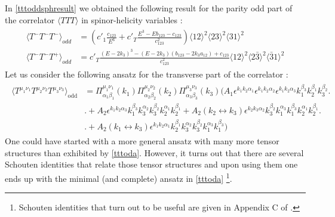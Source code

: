 \documentclass[a4paper,11pt]{article}
\begin{document}
In \eqref{tttoddsphresult} we obtained the following result for the parity odd part of the correlator $\langle TTT \rangle$ in spinor-helicity variables :  
%
\begin{align}\label{tttsph1}
\begin{split}
\langle T^-T^-T^- \rangle_{odd} &= \left(c'_1\frac{c_{123}}{E^6}+c'_T\frac{E^3-Eb_{123}-c_{123}}{c_{123}^2}\right)\langle 12 \rangle^2 \langle 23 \rangle^2 \langle 31 \rangle^2\\[5 pt]
\langle T^-T^-T^+ \rangle_{odd} &= c'_T\frac{(E-2k_3)^3-(E-2k_3)(b_{123}-2k_3 a_{12})+c_{123}}{c_{123}^2}\langle 12 \rangle^2 \langle 2\bar{3} \rangle^2 \langle \bar{3}1 \rangle^2
\end{split}
\end{align}
Let us consider the following ansatz for the transverse part of the correlator : 
\begin{align}\label{tttoda}
\begin{split}
\langle T^{\mu_1\nu_1}T^{\mu_2 \nu_2}T^{\mu_3\nu_3} \rangle_{\text{odd}}&=\Pi^{\mu_1\nu_1}_{\alpha_1\beta_1}(k_1)\Pi^{\mu_2\nu_2}_{\alpha_2\beta_2}(k_2)\Pi^{\mu_3\nu_3}_{\alpha_3\beta_3}(k_3)\bigg(A_1 \epsilon^{k_1 k_2 \alpha_1}\epsilon^{k_1 k_2 \alpha_2}\epsilon^{k_1 k_2 \alpha_3}k_1^{\beta_3}k_2^{\beta_1}k_3^{\beta_2}\bigg.\\[5 pt]
&\bigg.+A_2 \epsilon^{k_1 k_2 \alpha_3}k_1^{\beta_3}k_3^{\alpha_2}k_3^{\beta_2}k_2^{\alpha_1}k_2^{\beta_1}+A_2 (k_2 \leftrightarrow k_3) \epsilon^{k_2 k_3 \alpha_2}k_3^{\beta_2}k_1^{\alpha_3}k_1^{\beta_3}k_2^{\alpha_1}k_2^{\beta_1}\bigg.\\[5 pt]
&\bigg.+A_2 (k_1 \leftrightarrow k_3) \epsilon^{k_1 k_2 \alpha_1}k_2^{\beta_1}k_3^{\alpha_2}k_3^{\beta_2}k_1^{\alpha_3}k_1^{\beta_3}\bigg)
\end{split}
\end{align}
One could have started with a more general ansatz with many more tensor structures than exhibited by \eqref{tttoda}. However, it turns out that there are several Schouten identities that relate those tensor structures and upon using them one ends up with the minimal (and complete) ansatz  in \eqref{tttoda} \footnote{Schouten identities that turn out to be useful are given in Appendix C of \cite{Jain:2021wyn}.}.
\end{document}
